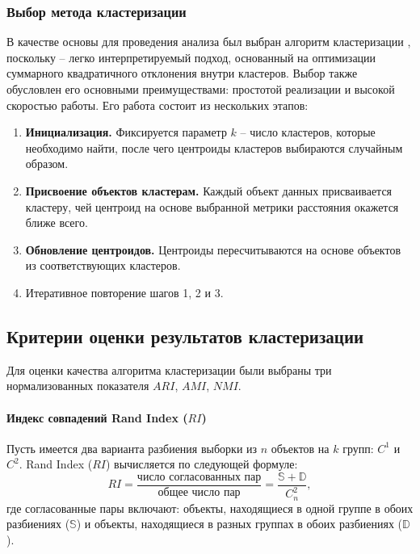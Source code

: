         \subsubsection*{Выбор метода кластеризации}
            В качестве основы для проведения анализа был выбран алгоритм кластеризации \kmeans{}, поскольку \kmeans{} -- легко интерпретируемый подход, основанный на оптимизации суммарного квадратичного отклонения внутри кластеров. Выбор \kmeans{} также обусловлен его основными преимуществами: простотой реализации и  высокой скоростью работы. Его работа состоит из нескольких этапов:
            \begin{enumerate}
                \item \textbf{Инициализация.}
                Фиксируется параметр \(k\) -- число кластеров, которые необходимо найти, после чего центроиды кластеров выбираются случайным образом.
                \item \textbf{Присвоение объектов кластерам.}
                Каждый объект данных присваивается кластеру, чей центроид на основе выбранной метрики расстояния окажется ближе всего.
                \item \textbf{Обновление центроидов.}
                Центроиды пересчитываются на основе объектов из соответствующих кластеров.
                \item Итеративное повторение шагов 1, 2 и 3.
            \end{enumerate}


    \subsection{Критерии оценки результатов кластеризации}
        Для оценки качества алгоритма кластеризации были выбраны три нормализованных показателя \(ARI\), \(AMI\), \(NMI\).

        \paragraph{Индекс совпадений Rand Index (\(RI\))}
            Пусть имеется два варианта разбиения выборки из \(n\) объектов на \(k\) групп: \(C^1\) и \(C^2\). Rand Index (\(RI\)) вычисляется по следующей формуле:
            \begin{equation}
                RI = \frac{\text{число согласованных пар}}{\text{общее число пар}} = \frac{\mathbb{S}+\mathbb{D}}{C_{n}^{2}},
            \end{equation}
            где согласованные пары включают: объекты, находящиеся в одной группе в обоих разбиениях (\(\mathbb{S}\)) и объекты, находящиеся в разных группах в обоих разбиениях (\(\mathbb{D}\)).

